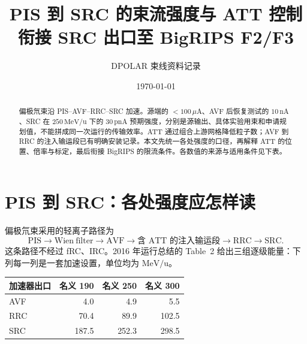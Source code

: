 \documentclass[UTF8,11pt,a4paper]{ctexart}
\title{PIS 到 SRC 的束流强度与 ATT 控制\\\large 衔接 SRC 出口至 BigRIPS F2/F3}
\author{DPOLAR 束线资料记录}
\date{\today}
\begin{document}
\maketitle

\begin{abstract}
偏极氘束沿 PIS--AVF--RRC--SRC 加速。源端的 $<100\,\mu\mathrm{A}$、AVF 后恢复测试的 $10\,\mathrm{nA}$、SRC 在 $250\,\mathrm{MeV/u}$ 下的 $30\,\mathrm{pnA}$ 预期强度，分别是源输出、具体实验用束和申请规划值，不能拼成同一次运行的传输效率。ATT 通过组合上游网格降低粒子数；AVF 到 RRC 的注入输运段已有明确安装记录。本文先统一各处强度的口径，再解释 ATT 的位置、倍率与标定，最后衔接 BigRIPS 的限流条件。各数值的来源与适用条件见下表。
\end{abstract}

\section{PIS 到 SRC：各处强度应怎样读}
\label{sec:pis-src}

偏极氘束采用的轻离子路径为
\[
\mathrm{PIS}\to\mathrm{Wien\ filter}\to\mathrm{AVF}
\to\boxed{\text{含 ATT 的注入输运段}}\to\mathrm{RRC}\to\mathrm{SRC}.
\]
这条路径不经过 fRC、IRC。2016 年运行总结的 Table~2 给出三组逐级能量：下列每一列是一套加速设置，单位均为 $\mathrm{MeV/u}$。\cite{sakamoto2016}
\begin{center}
\begin{tabular}{lrrr}
\toprule
加速器出口 & 名义 190 & 名义 250 & 名义 300 \\
\midrule
AVF & 4.0 & 4.9 & 5.5 \\
RRC & 70.4 & 89.9 & 102.5 \\
SRC & 187.5 & 252.3 & 298.5 \\
\bottomrule
\end{tabular}
\end{center}
\end{document}

